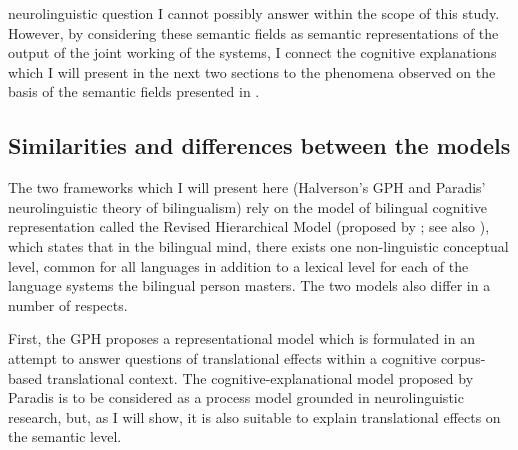 neurolinguistic question I cannot possibly answer within the scope of this study. However, by considering these semantic fields as semantic representations of the output of the joint working of the systems, I connect the cognitive explanations which I will present in the next two sections to the phenomena observed on the basis of the semantic fields presented in .

\subsection{Similarities and differences between the models}
\label{sec:5.1.3}  
The two frameworks which I will present here (Halverson’s GPH and Paradis’ neurolinguistic theory of bilingualism) rely on the model of bilingual cognitive representation called the Revised Hierarchical Model (proposed by \citealt{kroll_category_1994}; see also \citealt{brysbaert_is_2010,kroll_revised_2010}), which states that in the bilingual mind, there exists one non-linguistic conceptual level, common for all languages in addition to a lexical level for each of the language systems the bilingual person masters. The two models also differ in a number of respects. \citep{cook_effects_2003}

First, the GPH proposes a representational model which is formulated in an attempt to answer questions of translational effects within a cognitive corpus-based translational context. The cognitive-explanational model proposed by Paradis is to be considered as a process model grounded in neurolinguistic research, but, as I will show, it is also suitable to explain translational effects on the semantic level.

